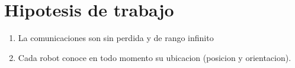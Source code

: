 \section{Hipotesis de trabajo}
\begin{enumerate}
  \item La comunicaciones son sin perdida y de rango infinito
  \item Cada robot conoce en todo momento su ubicacion (posicion y orientacion).
\end{enumerate}


